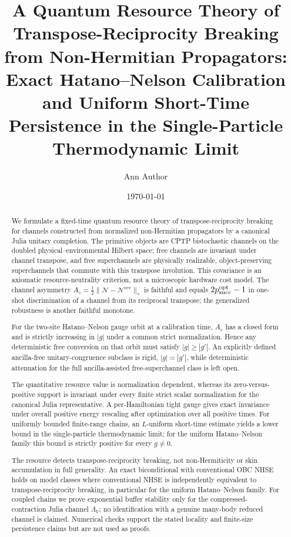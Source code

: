 \documentclass[reprint,amsmath,amssymb,aps,nofootinbib]{revtex4-2}
\newcommand{\rev}{\mathrm{rev}}
\begin{document}

\title{A Quantum Resource Theory of Transpose-Reciprocity Breaking from Non-Hermitian Propagators:\\
Exact Hatano--Nelson Calibration and Uniform Short-Time Persistence in the Single-Particle Thermodynamic Limit}

\author{Ann Author}

\date{\today}

\begin{abstract}
We formulate a fixed-time quantum resource theory of transpose-reciprocity breaking for channels
constructed from normalized non-Hermitian propagators by a canonical Julia unitary completion.
The primitive objects are CPTP bistochastic channels on the doubled physical--environmental Hilbert
space; free channels are invariant under channel transpose, and free superchannels are physically
realizable, object-preserving superchannels that commute with this transpose involution. This
covariance is an axiomatic resource-neutrality criterion, not a microscopic hardware cost model.
The channel asymmetry
$A_\diamond=\tfrac12\|\mathcal N-\mathcal N^{\rev}\|_\diamond$
is faithful and equals $2p_{\rm succ}^{\rm opt}-1$ in one-shot discrimination of a channel from
its reciprocal transpose; the generalized robustness is another faithful monotone.

For the two-site Hatano--Nelson gauge orbit at a calibration time, $A_\diamond$ has a closed form
and is strictly increasing in $|g|$ under a common strict normalization. Hence any deterministic
free conversion on that orbit must satisfy $|g|\ge |g'|$. An explicitly defined ancilla-free
unitary-congruence subclass is rigid, $|g|=|g'|$, while deterministic attenuation for the full
ancilla-assisted free-superchannel class is left open.

The quantitative resource value is normalization dependent, whereas its zero-versus-positive
support is invariant under every finite strict scalar normalization for the canonical Julia
representative. A per-Hamiltonian tight gauge gives exact invariance under overall positive energy
rescaling after optimization over all positive times. For uniformly bounded finite-range chains,
an $L$-uniform short-time estimate yields a lower bound in the single-particle thermodynamic limit;
for the uniform Hatano--Nelson family this bound is strictly positive for every $g\ne0$.

The resource detects transpose-reciprocity breaking, not non-Hermiticity or skin accumulation in
full generality. An exact biconditional with conventional OBC NHSE holds on model classes where
conventional NHSE is independently equivalent to transpose-reciprocity breaking, in particular
for the uniform Hatano--Nelson family. For coupled chains we prove exponential buffer stability
only for the compressed-contraction Julia channel $\Lambda_V$; no identification with a genuine
many-body reduced channel is claimed. Numerical checks support the stated locality and
finite-size persistence claims but are not used as proofs.
\end{abstract}
\end{document}
